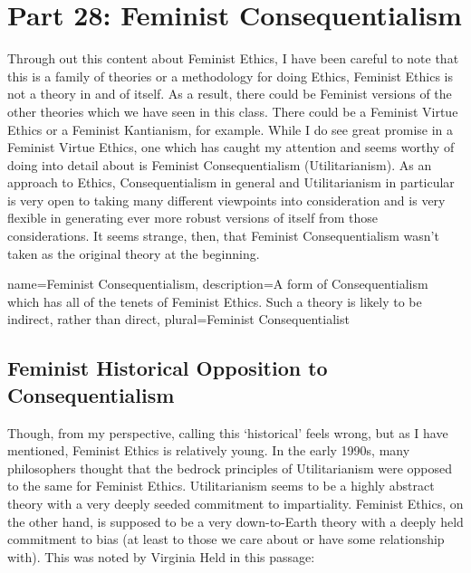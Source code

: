 \chapter{Part 28: Feminist Consequentialism}

Through out this content about Feminist Ethics, I have been careful to note that this is a family of theories or a methodology for doing Ethics, Feminist Ethics is not a theory in and of itself. As a result, there could be Feminist versions of the other theories which we have seen in this class. There could be a Feminist Virtue Ethics or a Feminist Kantianism, for example. While I do see great promise in a Feminist Virtue Ethics, one which has caught my attention and seems worthy of doing into detail about is \gls{Feminist Consequentialism} (Utilitarianism).\autocite{Driver2} As an approach to Ethics, Consequentialism in general and Utilitarianism in particular is very open to taking many different viewpoints into consideration and is very flexible in generating ever more robust versions of itself from those considerations. It seems strange, then, that Feminist Consequentialism wasn't taken as the original theory at the beginning.

{
  name=Feminist Consequentialism,
  description={A form of Consequentialism which has all of the tenets of Feminist Ethics. Such a theory is likely to be indirect, rather than direct},
  plural=Feminist Consequentialist
}


\section{Feminist Historical Opposition to Consequentialism}

Though, from my perspective, calling this `historical' feels wrong, but as I have mentioned, Feminist Ethics is relatively young. In the early 1990s, many philosophers thought that the bedrock principles of Utilitarianism were opposed to the same for Feminist Ethics. Utilitarianism seems to be a highly abstract theory with a very deeply seeded commitment to impartiality. Feminist Ethics, on the other hand, is supposed to be a very down-to-Earth theory with a deeply held commitment to bias (at least to those we care about or have some relationship with). This was noted by Virginia Held in this passage:\autocite{Held1}


